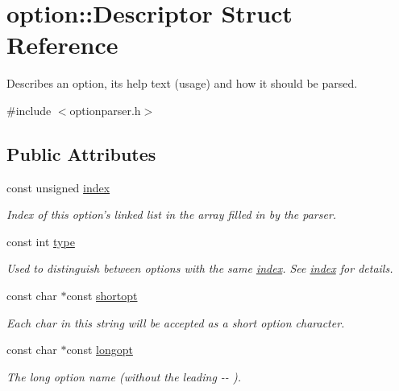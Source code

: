 \hypertarget{structoption_1_1_descriptor}{\section{option\-:\-:\-Descriptor \-Struct \-Reference}
\label{structoption_1_1_descriptor}
}


\-Describes an option, its help text (usage) and how it should be parsed.  




{\ttfamily \#include $<$optionparser.\-h$>$}

\subsection*{\-Public \-Attributes}
\begin{DoxyCompactItemize}
\item 
const unsigned \hyperlink{structoption_1_1_descriptor_a1fee8ac44f529c99ac2b1149b4c391b1}{index}
\begin{DoxyCompactList}\small\item\em \-Index of this option's linked list in the array filled in by the parser. \end{DoxyCompactList}\item 
const int \hyperlink{structoption_1_1_descriptor_a1b220dabd8aad075fa441a80f9b9343c}{type}
\begin{DoxyCompactList}\small\item\em \-Used to distinguish between options with the same \hyperlink{structoption_1_1_descriptor_a1fee8ac44f529c99ac2b1149b4c391b1}{index}. \-See \hyperlink{structoption_1_1_descriptor_a1fee8ac44f529c99ac2b1149b4c391b1}{index} for details. \end{DoxyCompactList}\item 
const char $\ast$const \hyperlink{structoption_1_1_descriptor_a0dba4ccca59c19d6ed4081391fca5adb}{shortopt}
\begin{DoxyCompactList}\small\item\em \-Each char in this string will be accepted as a short option character. \end{DoxyCompactList}\item 
const char $\ast$const \hyperlink{structoption_1_1_descriptor_a470c449dfa894c9bfda2dae026142b4b}{longopt}
\begin{DoxyCompactList}\small\item\em \-The long option name (without the leading {\ttfamily -\/-\/} ). \end{DoxyCompactList}\item 

\end{DoxyCompactItemize}
